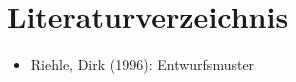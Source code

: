 \section{Literaturverzeichnis}
\begin{itemize}
\item Riehle, Dirk (1996): \glqq Entwurfsmuster\grqq
\end{itemize}